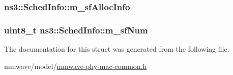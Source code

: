 \subsubsection[{\texorpdfstring{m\+\_\+sf\+Alloc\+Info}{m_sfAllocInfo}}]{ ns3\+::\+Sched\+Info\+::m\+\_\+sf\+Alloc\+Info}\hypertarget{structns3_1_1SchedInfo_a2c05f265a92b2fddc86b417656794d9f}{}\label{structns3_1_1SchedInfo_a2c05f265a92b2fddc86b417656794d9f}
\subsubsection[{\texorpdfstring{m\+\_\+sf\+Num}{m_sfNum}}]{\setlength{\rightskip}{0pt plus 5cm}uint8\+\_\+t ns3\+::\+Sched\+Info\+::m\+\_\+sf\+Num}\hypertarget{structns3_1_1SchedInfo_aed7bf8429de70b2e6665819dc76db025}{}\label{structns3_1_1SchedInfo_aed7bf8429de70b2e6665819dc76db025}


The documentation for this struct was generated from the following file\+:\begin{DoxyCompactItemize}
\item 
mmwave/model/\hyperlink{mmwave-phy-mac-common_8h}{mmwave-\/phy-\/mac-\/common.\+h}\end{DoxyCompactItemize}
